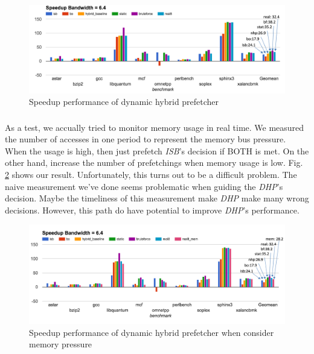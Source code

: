 \begin{figure}[ht!]
   \centering
   \includegraphics[width=1.0\textwidth]{images/final_speedup.png}
   \caption{Speedup performance of dynamic hybrid prefetcher}
   \label{fig:final_speedup}
\end{figure}

\subsubsection*{}
As a test, we accually tried to monitor memory usage in real time. We measured the number of accesses in one period to represent the memory bus pressure. When the usage is high, then just prefetch \emph{ISB}'s decision if BOTH is met. On the other hand, increase the number of prefetchings when memory usage is low. Fig. \ref{fig:final_speedup_mem} shows our result. Unfortunately, this turns out to be a difficult problem. The naive measurement we've done seems problematic when guiding the \emph{DHP}'s decision. Maybe the timeliness of this measurement make \emph{DHP} make many wrong decisions. However, this path do have potential to improve \emph{DHP}'s performance.

\begin{figure}[ht!]
   \centering
   \includegraphics[width=1.0\textwidth]{images/final_speedup_mem.png}
   \caption{Speedup performance of dynamic hybrid prefetcher when consider memory pressure}
   \label{fig:final_speedup_mem}
\end{figure}
